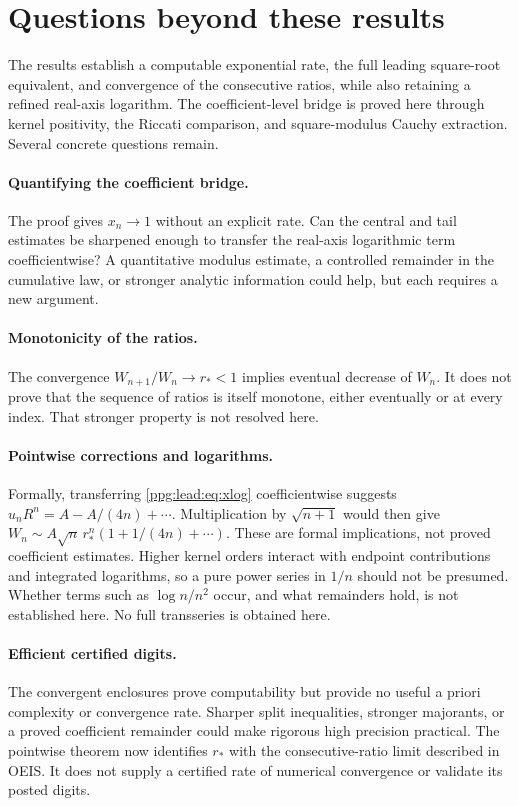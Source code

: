 \documentclass[11pt,letterpaper]{article}
\theoremstyle{remark}\newtheorem{remark}[theorem]{Remark}
\numberwithin{equation}{section}
\begin{document}
\section{Questions beyond these results}\label{ppg:lead:sec:questions}
The results establish a computable exponential rate, the full leading square-root equivalent, and convergence of the consecutive ratios, while also retaining a refined real-axis logarithm. The coefficient-level bridge is proved here through kernel positivity, the Riccati comparison, and square-modulus Cauchy extraction. Several concrete questions remain.

\paragraph{Quantifying the coefficient bridge.}
The proof gives $x_n\to1$ without an explicit rate. Can the central and tail estimates be sharpened enough to transfer the real-axis logarithmic term coefficientwise? A quantitative modulus estimate, a controlled remainder in the cumulative law, or stronger analytic information could help, but each requires a new argument.

\paragraph{Monotonicity of the ratios.}
The convergence $W_{n+1}/W_n\to r_*<1$ implies eventual decrease of $W_n$. It does not prove that the sequence of ratios is itself monotone, either eventually or at every index. That stronger property is not resolved here.

\paragraph{Pointwise corrections and logarithms.}
Formally, transferring \eqref{ppg:lead:eq:xlog} coefficientwise suggests
$u_nR^n=A-A/(4n)+\cdots$. Multiplication by $\sqrt{n+1}$ would then give
$W_n\sim A\sqrt n\,r_*^n(1+1/(4n)+\cdots)$. These are formal implications, not proved coefficient estimates. Higher kernel orders interact with endpoint contributions and integrated logarithms, so a pure power series in $1/n$ should not be presumed. Whether terms such as $\log n/n^2$ occur, and what remainders hold, is not established here. No full transseries is obtained here.

\paragraph{Efficient certified digits.}
The convergent enclosures prove computability but provide no useful a priori complexity or convergence rate. Sharper split inequalities, stronger majorants, or a proved coefficient remainder could make rigorous high precision practical. The pointwise theorem now identifies $r_*$ with the consecutive-ratio limit described in OEIS. It does not supply a certified rate of numerical convergence or validate its posted digits.
\end{document}
